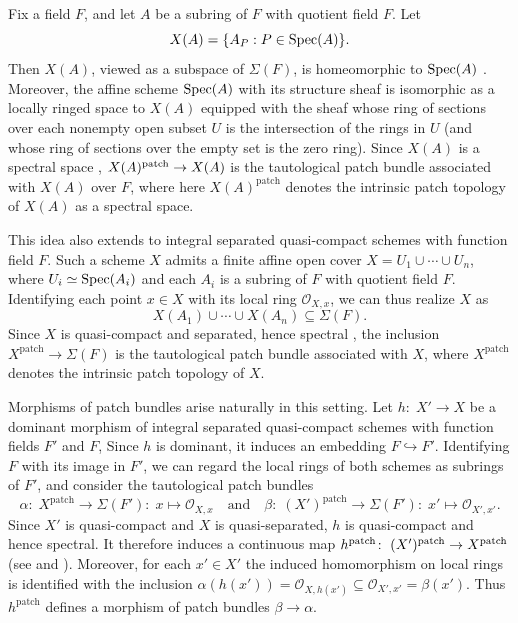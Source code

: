 \documentclass[11pt]{amsart}
\begin{document}
\begin{example} \label{scheme 1} Fix a field $F$, and let $A$ be a subring of $F$ with quotient field $F$. Let
\[
X(A)=\{A_P:P\in\mbox{\rm Spec}(A)\}.
\]
Then $X(A)$, viewed as a subspace of $\Sigma(F)$, is homeomorphic to $\mbox{\rm Spec}(A)$
\cite[Lemma~2.4]{DobbsFedderFontana}.
Moreover, the affine scheme $\mbox{\rm Spec}(A)$ with its structure sheaf is isomorphic as a locally ringed
space to $X(A)$ equipped with the sheaf whose ring of sections over each nonempty open subset
$U$ is the intersection of the rings in $U$ (and whose ring of sections over the empty set is the zero ring). 
Since $X(A)$ is a spectral space \cite[Theorem~3.2]{SpiritoLoc}, $X(A)^{\rm patch} \rightarrow X(A)$ is the tautological patch bundle associated with $X(A)$ over $F$, where here $X(A)^{\mathrm{patch}}$ denotes the intrinsic patch topology of $X(A)$ as a spectral space.   

This idea also extends to integral separated quasi-compact schemes with function field $F$. Such a scheme $X$ admits a finite affine open cover $X=U_1\cup\cdots\cup U_n$, where $U_i\simeq\mbox{\rm Spec}(A_i)$ and each $A_i$ is a subring of $F$ with quotient field $F$. Identifying each point $x\in X$ with its local ring $\mathcal O_{X,x}$, we can thus realize $X$ as
\[
X(A_1)\cup\cdots\cup X(A_n)\subseteq\Sigma(F).
\]
Since $X$ is quasi-compact and separated, hence spectral \cite[\href{https://stacks.math.columbia.edu/tag/094L}{Tag 094L}]{stacks-project}, the inclusion $X^{\mathrm{patch}}\rightarrow\Sigma(F)$ is the tautological patch bundle associated with $X$, where $X^{\mathrm{patch}}$ denotes the intrinsic patch topology of $X$. 

Morphisms of patch bundles arise naturally in this setting.  Let $h\colon\; X'\to X$ be a dominant morphism of integral separated quasi-compact schemes with function fields $F'$ and $F$, Since $h$ is dominant, it induces an embedding $F\hookrightarrow F'$. Identifying $F$ with its image in $F'$, we can regard the local rings of both schemes as subrings of $F'$, and consider the tautological patch bundles $$
\alpha\colon\; X^{\mathrm{patch}}\longrightarrow\Sigma(F')\colon\; x\longmapsto\mathcal O_{X,x}\quad\text{and}\quad\beta\colon\; (X')^{\mathrm{patch}}\longrightarrow\Sigma(F')\colon\; x'\longmapsto\mathcal O_{X',x'}. $$
Since $X'$ is quasi-compact and $X$ is quasi-separated, $h$ is quasi-compact and hence spectral. It therefore induces a continuous map $h^{\rm patch}\colon\; (X')^{\mathrm{patch}}\to X^{\mathrm{patch}}$ (see \cite[\href{https://stacks.math.columbia.edu/tag/03GI}{Tag 03GI}]{stacks-project}
and \cite[\href{https://stacks.math.columbia.edu/tag/0G1J}{Tag 0G1J}]{stacks-project}). Moreover, for each $x'\in X'$ the induced homomorphism on local rings is identified with the inclusion $ \alpha(h(x'))=\mathcal O_{X,h(x')} \subseteq \mathcal O_{X',x'}=\beta(x').$ Thus $h^{\mathrm{patch}}$ defines a morphism of patch bundles $\beta\to\alpha$.
\end{example}
\end{document}

